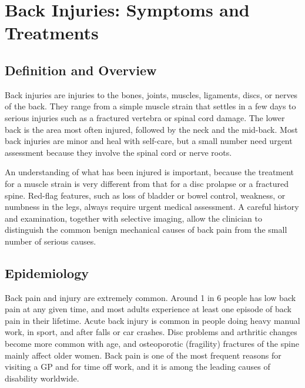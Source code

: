 \chapter{Back Injuries: Symptoms and Treatments}

\section*{Definition and Overview}
Back injuries are injuries to the bones, joints, muscles, ligaments, discs, or nerves of the back. They range from a simple muscle strain that settles in a few days to serious injuries such as a fractured vertebra or spinal cord damage. The lower back is the area most often injured, followed by the neck and the mid-back. Most back injuries are minor and heal with self-care, but a small number need urgent assessment because they involve the spinal cord or nerve roots.

An understanding of what has been injured is important, because the treatment for a muscle strain is very different from that for a disc prolapse or a fractured spine. Red-flag features, such as loss of bladder or bowel control, weakness, or numbness in the legs, always require urgent medical assessment. A careful history and examination, together with selective imaging, allow the clinician to distinguish the common benign mechanical causes of back pain from the small number of serious causes.

\section*{Epidemiology}
Back pain and injury are extremely common. Around 1 in 6 people has low back pain at any given time, and most adults experience at least one episode of back pain in their lifetime. Acute back injury is common in people doing heavy manual work, in sport, and after falls or car crashes. Disc problems and arthritic changes become more common with age, and osteoporotic (fragility) fractures of the spine mainly affect older women. Back pain is one of the most frequent reasons for visiting a GP and for time off work, and it is among the leading causes of disability worldwide.

